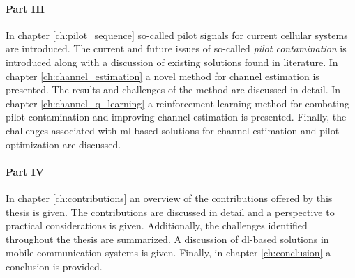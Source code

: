 \paragraph{Part III} In chapter \ref{ch:pilot_sequence} so-called pilot signals for current cellular systems are introduced. The current and future issues of so-called \emph{pilot contamination} is introduced along with a discussion of existing solutions found in literature. In chapter \ref{ch:channel_estimation} a novel method for channel estimation is presented. The results and challenges of the method are discussed in detail. In chapter \ref{ch:channel_q_learning} a reinforcement learning method for combating pilot contamination and improving channel estimation is presented. Finally, the challenges associated with \gls{ml}-based solutions for channel estimation and pilot optimization are discussed. 

\paragraph{Part IV} In chapter \ref{ch:contributions} an overview of the contributions offered by this thesis is given. The contributions are discussed in detail and a perspective to practical considerations is given. Additionally, the challenges identified throughout the thesis are summarized. A discussion of \gls{dl}-based solutions in mobile communication systems is given. Finally, in chapter \ref{ch:conclusion} a conclusion is provided.




